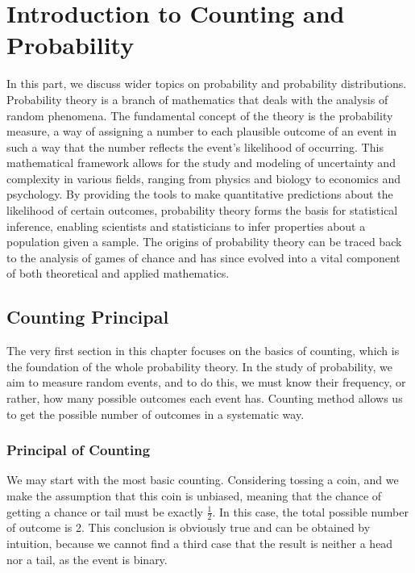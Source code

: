 \chapterspaceabove{6.75cm} 
\chapterspacebelow{7.25cm} 



\chapter{Introduction to Counting and Probability }\label{counting}
In this part, we discuss wider topics on probability and probability distributions. 
Probability theory is a branch of mathematics that deals with the analysis of random phenomena. The fundamental concept of the theory is the probability measure, a way of assigning a number to each plausible outcome of an event in such a way that the number reflects the event's likelihood of occurring. This mathematical framework allows for the study and modeling of uncertainty and complexity in various fields, ranging from physics and biology to economics and psychology. By providing the tools to make quantitative predictions about the likelihood of certain outcomes, probability theory forms the basis for statistical inference, enabling scientists and statisticians to infer properties about a population given a sample. The origins of probability theory can be traced back to the analysis of games of chance and has since evolved into a vital component of both theoretical and applied mathematics.

    \section{Counting Principal}
    The very first section in this chapter focuses on the basics of counting, which is the foundation of the whole probability theory. In the study of probability, we aim to measure 
    random events, and to do this, we must know their frequency, or rather, how many possible outcomes each event has. Counting method allows us to get the possible number of outcomes in a 
    systematic way.

    \subsection{Principal of Counting}
    We may start with the most basic counting. Considering tossing a coin, and we make the assumption that this coin is unbiased, meaning that the chance of getting a chance or tail must be 
    exactly $\frac{1}{2}$. In this case, the total possible number of outcome is 2. This conclusion is obviously true and can be obtained by intuition, because we cannot find a third case that the result is neither a head nor a tail, as the event
    is binary.

